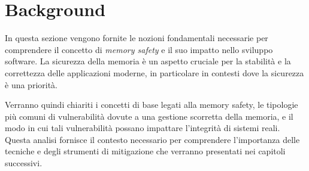 \chapter{Background}
\label{cha:background}

In questa sezione vengono fornite le nozioni fondamentali necessarie per
comprendere il concetto di \textit{memory safety} e il suo impatto nello sviluppo
software. La sicurezza della memoria è un aspetto cruciale per la stabilità e la
correttezza delle applicazioni moderne, in particolare in contesti dove la sicurezza
è una priorità.

Verranno quindi chiariti i concetti di base legati alla memory safety, le
tipologie più comuni di vulnerabilità dovute a una gestione scorretta della
memoria, e il modo in cui tali vulnerabilità possano impattare l'integrità di sistemi
reali. Questa analisi fornisce il contesto necessario per comprendere l'importanza
delle tecniche e degli strumenti di mitigazione che verranno presentati nei
capitoli successivi.





